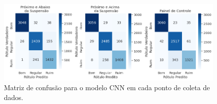 \begin{figure}[H]
  \centering
  \caption{Matriz de confusão para o modelo CNN em cada ponto de coleta de dados.}
  \label{fig:cnn_confusion_matrix_qualidade_superficie}
  \includegraphics[width=1\textwidth]{figuras/fig_51.png}
\end{figure}